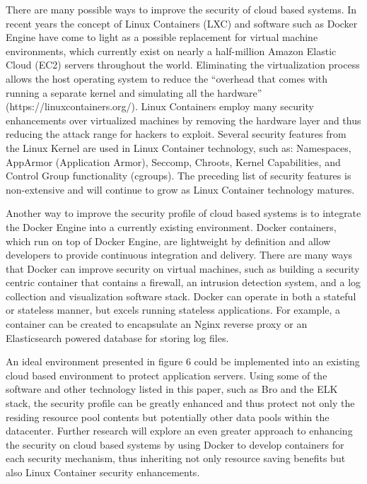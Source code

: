 \documentclass[./main.tex]{subfiles}
\begin{document}
There are many possible ways to improve the security of cloud based systems. In recent years the concept of Linux Containers (LXC) and software such as Docker Engine have come to light as a possible replacement for virtual machine environments, which currently exist on nearly a half-million Amazon Elastic Cloud (EC2) servers throughout the world. Eliminating the virtualization process allows the host operating system to reduce the “overhead that comes with running a separate kernel and simulating all the hardware” (https://linuxcontainers.org/). Linux Containers employ many security enhancements over virtualized machines by removing the hardware layer and thus reducing the attack range for hackers to exploit. Several security features from the Linux Kernel are used in Linux Container technology, such as: Namespaces, AppArmor (Application Armor), Seccomp, Chroots, Kernel Capabilities, and Control Group functionality (cgroups). The preceding list of security features is non-extensive and will continue to grow as Linux Container technology matures.

Another way to improve the security profile of cloud based systems is to integrate the Docker Engine into a currently existing environment. Docker containers, which run on top of Docker Engine, are lightweight by definition and allow developers to provide continuous integration and delivery. There are many ways that Docker can improve security on virtual machines, such as building a security centric container that contains a firewall, an intrusion detection system, and a log collection and visualization software stack. Docker can operate in both a stateful or stateless manner, but excels running stateless applications. For example, a container can be created to encapsulate an Nginx reverse proxy or an Elasticsearch powered database for storing log files.

An ideal environment presented in figure 6 could be implemented into an existing cloud based environment to protect application servers. Using some of the software and other technology listed in this paper, such as Bro and the ELK stack, the security profile can be greatly enhanced and thus protect not only the residing resource pool contents but potentially other data pools within the datacenter. Further research will explore an even greater approach to enhancing the security on cloud based systems by using Docker to develop containers for each security mechanism, thus inheriting not only resource saving benefits but also Linux Container security enhancements.
\end{document}
